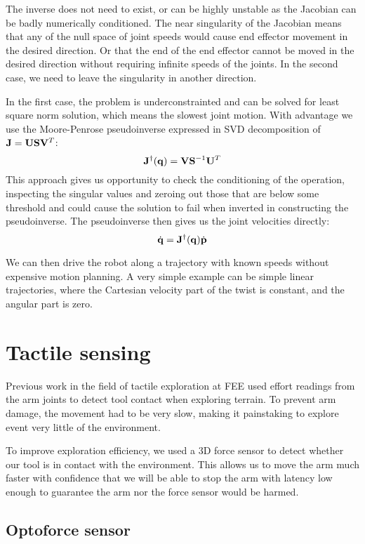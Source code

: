 \documentclass[buriama8_dp.tex]{subfiles}
\begin{document}
The inverse does not need to exist, or can be highly unstable as the Jacobian can be badly numerically conditioned. The near singularity of the Jacobian means that any of the null space of joint speeds would cause end effector movement in the desired direction. Or that the end of the end effector cannot be moved in the desired direction without requiring infinite speeds of the joints. In the second case, we need to leave the singularity in another direction.

In the first case, the problem is underconstrainted and can be solved for least square norm solution, which means the slowest joint motion. With advantage we use the Moore-Penrose pseudoinverse expressed in SVD decomposition of \(\mathbf{J} = \mathbf{U} \mathbf{S} \mathbf{V}^T \):
\[
\mathbf{J}^\dagger(\mathbf{q}) = \mathbf{V} \mathbf{S}^{-1} \mathbf{U}^T
\]
This approach gives us opportunity to check the conditioning of the operation, inspecting the singular values and zeroing out those that are below some threshold and could cause the solution to fail when inverted in constructing the pseudoinverse. The pseudoinverse then gives us the joint velocities directly:
\[
 \dot{\mathbf{q}} = \mathbf{J}^\dagger(\mathbf{q}) \dot{\mathbf{p}}
\]

We can then drive the robot along a trajectory with known speeds without expensive motion planning. A very simple example can be simple linear trajectories, where the Cartesian velocity part of the twist is constant, and the angular part is zero.

\section{Tactile sensing}
\label{sec:tactile}

Previous work in the field of tactile exploration at FEE \cite{vojta} used effort readings from the arm joints to detect tool contact when exploring terrain. To prevent arm damage, the movement had to be very slow, making it painstaking to explore event very little of the environment.

To improve exploration efficiency, we used a 3D force sensor to detect whether our tool is in contact with the environment. This allows us to move the arm much faster with confidence that we will be able to stop the arm with latency low enough to guarantee the arm nor the force sensor would be harmed.

\subsection{Optoforce sensor}
\label{subsec:opto}
\end{document}

